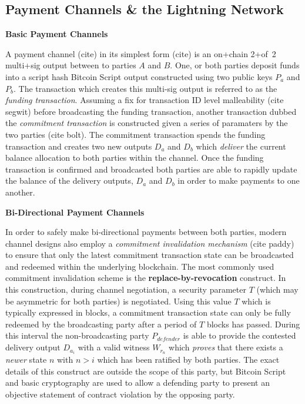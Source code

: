 \documentclass[12pt,a4paper]{article}
\theoremstyle{definition}
\begin{document}
\subsection{Payment Channels \& the Lightning Network} 

\begin{center}
\textbf{Basic Payment Channels}
\end{center}

A payment channel (cite) in its simplest form (cite) is an on+chain 2+of~2
multi+sig output between to parties $A$ and $B$. One, or both parties deposit
funds into a script hash Bitcoin Script output constructed using two public
keys $P_{a}$ and $P_{b}$. The transaction which creates this multi-sig output
is referred to as the \emph{funding transaction}. Assuming a fix for
transaction ID level malleability (cite segwit) before broadcasting the funding
transaction, another transaction dubbed the \emph{commitment transaction} is
constructed given a series of paramaters by the two parties (cite bolt). The
commitment transaction spends the funding transaction and creates two new
outputs $D_{a}$ and $D_{b}$ which \emph{deliver} the current balance allocation
to both parties within the channel. Once the funding transaction is confirmed
and broadcasted both parties are able to rapidly update the balance of the
delivery outputs, $D_{a}$ and $D_{b}$ in order to make payments to one another. \\

\begin{center}
\textbf{Bi-Directional Payment Channels}
\end{center}

In order to safely make bi-directional payments between both parties, modern
channel designs also employ a \emph{commitment invalidation mechanism} (cite
paddy) to ensure that only the latest commitment transaction state can be
broadcasted and redeemed within the underlying blockchain. The most commonly
used commitment invalidation scheme is the \textbf{replace-by-revocation}
construct. In this construction, during channel negotiation, a security
parameter $T$ (which may be asymmetric for both parties) is negotiated. Using
this value $T$ which is typically expressed in blocks, a commitment transaction
state can only be fully redeemed by the broadcasting party after a period of
$T$ blocks has passed. During this interval the non-broadcasting party
$P_{defender}$ is able to provide the contested delivery output $D_{a_i}$ with
a valid witness $W_{r_n}$ which \emph{proves} that there exists a  \emph{newer}
state $n$ with $n > i$ which has been ratified by both parties. The exact
details of this construct are outside the scope of this party, but Bitcoin
Script and basic cryptography are used to allow a defending party to present an
objective statement of contract violation by the opposing party. \\
\end{document}

